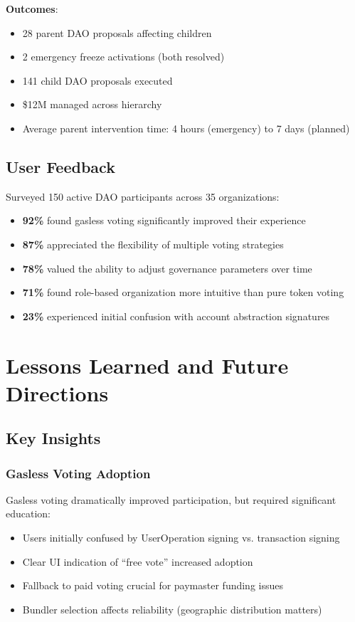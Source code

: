 \documentclass[11pt,a4paper]{article}
\begin{document}
\textbf{Outcomes}:
\begin{itemize}
    \item 28 parent DAO proposals affecting children
    \item 2 emergency freeze activations (both resolved)
    \item 141 child DAO proposals executed
    \item \$12M managed across hierarchy
    \item Average parent intervention time: 4 hours (emergency) to 7 days (planned)
\end{itemize}

\subsection{User Feedback}

Surveyed 150 active DAO participants across 35 organizations:

\begin{itemize}
    \item \textbf{92\%} found gasless voting significantly improved their experience
    \item \textbf{87\%} appreciated the flexibility of multiple voting strategies
    \item \textbf{78\%} valued the ability to adjust governance parameters over time
    \item \textbf{71\%} found role-based organization more intuitive than pure token voting
    \item \textbf{23\%} experienced initial confusion with account abstraction signatures
\end{itemize}

\section{Lessons Learned and Future Directions}

\subsection{Key Insights}

\subsubsection{Gasless Voting Adoption}

Gasless voting dramatically improved participation, but required significant education:
\begin{itemize}
    \item Users initially confused by UserOperation signing vs. transaction signing
    \item Clear UI indication of ``free vote'' increased adoption
    \item Fallback to paid voting crucial for paymaster funding issues
    \item Bundler selection affects reliability (geographic distribution matters)
\end{itemize}
\end{document}
